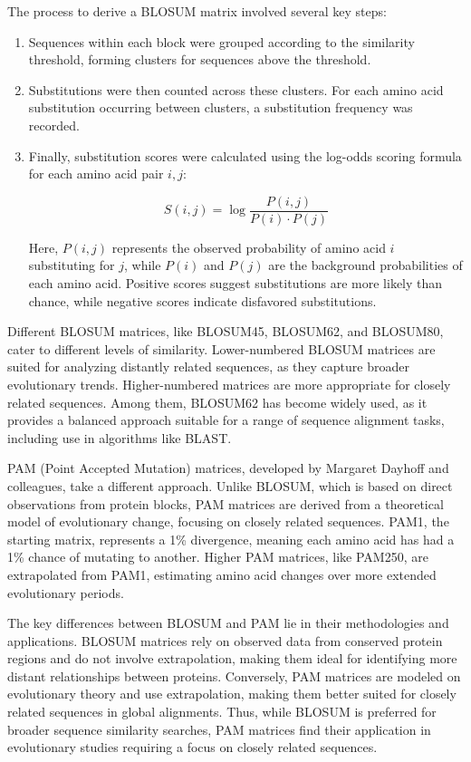The process to derive a BLOSUM matrix involved several key steps:
\begin{enumerate}
    \item Sequences within each block were grouped according to the similarity threshold, forming clusters for sequences above the threshold.
    \item Substitutions were then counted across these clusters. For each amino acid substitution occurring between clusters, a substitution frequency was recorded.
    \item Finally, substitution scores were calculated using the log-odds scoring formula for each amino acid pair $i, j$:
    
    \begin{equation}
    S(i, j) = \log \frac{P(i, j)}{P(i) \cdot P(j)}
    \end{equation}
    
    Here, $P(i, j)$ represents the observed probability of amino acid $i$ substituting for $j$, while $P(i)$ and $P(j)$ are the background probabilities of each amino acid. Positive scores suggest substitutions are more likely than chance, while negative scores indicate disfavored substitutions.
\end{enumerate}

Different BLOSUM matrices, like BLOSUM45, BLOSUM62, and BLOSUM80, cater to different levels of similarity. Lower-numbered BLOSUM matrices are suited for analyzing distantly related sequences, as they capture broader evolutionary trends. Higher-numbered matrices are more appropriate for closely related sequences. Among them, BLOSUM62 has become widely used, as it provides a balanced approach suitable for a range of sequence alignment tasks, including use in algorithms like BLAST.

PAM (Point Accepted Mutation) matrices, developed by Margaret Dayhoff and colleagues, take a different approach. Unlike BLOSUM, which is based on direct observations from protein blocks, PAM matrices are derived from a theoretical model of evolutionary change, focusing on closely related sequences. PAM1, the starting matrix, represents a 1\% divergence, meaning each amino acid has had a 1\% chance of mutating to another. Higher PAM matrices, like PAM250, are extrapolated from PAM1, estimating amino acid changes over more extended evolutionary periods.

The key differences between BLOSUM and PAM lie in their methodologies and applications. BLOSUM matrices rely on observed data from conserved protein regions and do not involve extrapolation, making them ideal for identifying more distant relationships between proteins. Conversely, PAM matrices are modeled on evolutionary theory and use extrapolation, making them better suited for closely related sequences in global alignments. Thus, while BLOSUM is preferred for broader sequence similarity searches, PAM matrices find their application in evolutionary studies requiring a focus on closely related sequences.

